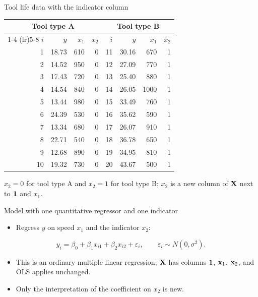 \begin{frame}{Tool life data with the indicator column}
    \centering
    \begin{tabular}{rrrr@{\hspace{2.5em}}rrrr}
        \toprule
        \multicolumn{4}{c}{Tool type A} & \multicolumn{4}{c}{Tool type B} \\
        \cmidrule(lr){1-4} \cmidrule(lr){5-8}
        $i$ & $y$ & $x_1$ & $x_2$ & $i$ & $y$ & $x_1$ & $x_2$ \\
        \midrule
        1  & 18.73 & 610  & 0 & 11 & 30.16 & 670  & 1 \\
        2  & 14.52 & 950  & 0 & 12 & 27.09 & 770  & 1 \\
        3  & 17.43 & 720  & 0 & 13 & 25.40 & 880  & 1 \\
        4  & 14.54 & 840  & 0 & 14 & 26.05 & 1000 & 1 \\
        5  & 13.44 & 980  & 0 & 15 & 33.49 & 760  & 1 \\
        6  & 24.39 & 530  & 0 & 16 & 35.62 & 590  & 1 \\
        7  & 13.34 & 680  & 0 & 17 & 26.07 & 910  & 1 \\
        8  & 22.71 & 540  & 0 & 18 & 36.78 & 650  & 1 \\
        9  & 12.68 & 890  & 0 & 19 & 34.95 & 810  & 1 \\
        10 & 19.32 & 730  & 0 & 20 & 43.67 & 500  & 1 \\
        \bottomrule
    \end{tabular}
 
    \vspace{0.8em}
    \raggedright
    $x_2 = 0$ for tool type A and $x_2 = 1$ for tool type B; $x_2$ is a new column of $\mathbf{X}$ next to $\mathbf{1}$ and $x_1$.
\end{frame}


\begin{frame}{Model with one quantitative regressor and one indicator}
    \begin{itemize}
        \item Regress $y$ on speed $x_1$ and the indicator $x_2$:
    \end{itemize}
    \[
        y_i = \beta_0 + \beta_1 x_{i1} + \beta_2 x_{i2} + \varepsilon_i, \qquad \varepsilon_i \sim N(0, \sigma^2).
    \]
    \begin{itemize}
        \item This is an ordinary multiple linear regression; $\mathbf{X}$ has columns $\mathbf{1}$, $\mathbf{x}_1$, $\mathbf{x}_2$, and OLS applies unchanged.
        \item Only the interpretation of the coefficient on $x_2$ is new.
    \end{itemize}
\end{frame}


